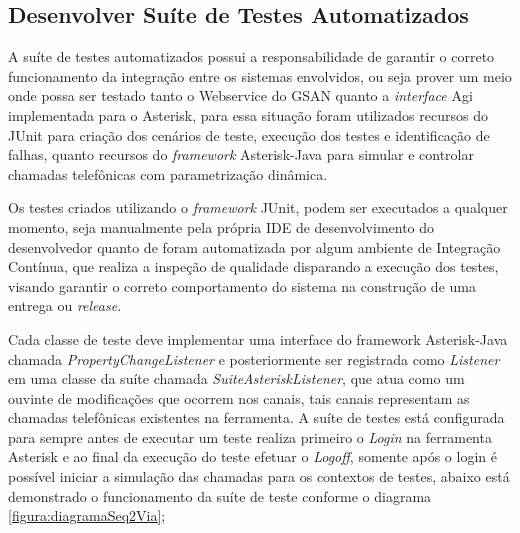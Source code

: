 \subsection{Desenvolver Suíte de Testes Automatizados}

A suíte de testes automatizados possui a responsabilidade de garantir o correto funcionamento da integração entre os sistemas envolvidos, ou seja prover um meio onde possa ser testado tanto o Webservice do GSAN quanto a \textit{interface} Agi implementada para o Asterisk, para essa situação foram utilizados recursos do JUnit para criação dos cenários de teste, execução dos testes e identificação de falhas, quanto recursos do \textit{framework} Asterisk-Java para simular e controlar chamadas telefônicas com parametrização dinâmica.   

Os testes criados utilizando o \textit{framework} JUnit, podem ser executados a qualquer momento, seja manualmente pela própria IDE de desenvolvimento do desenvolvedor quanto de foram automatizada por algum ambiente de Integração Contínua, que realiza a inspeção de qualidade disparando a execução dos testes, visando garantir o correto comportamento do sistema na construção de uma entrega ou \textit{release}.

Cada classe de teste deve implementar uma interface do framework Asterisk-Java chamada \textit{PropertyChangeListener} e posteriormente ser registrada como \textit{Listener} em uma classe da suíte chamada \textit{SuiteAsteriskListener}, que atua como um ouvinte de modificações que ocorrem nos canais, tais canais representam as chamadas telefônicas existentes na ferramenta. 
A suíte de testes está configurada para sempre antes de executar um teste realiza primeiro o \textit{Login} na ferramenta Asterisk e ao final da execução do teste efetuar o \textit{Logoff}, somente após o login é possível iniciar a simulação das chamadas para os contextos de testes, abaixo está demonstrado o funcionamento da suíte de teste conforme o diagrama \ref{figura:diagramaSeq2Via};

